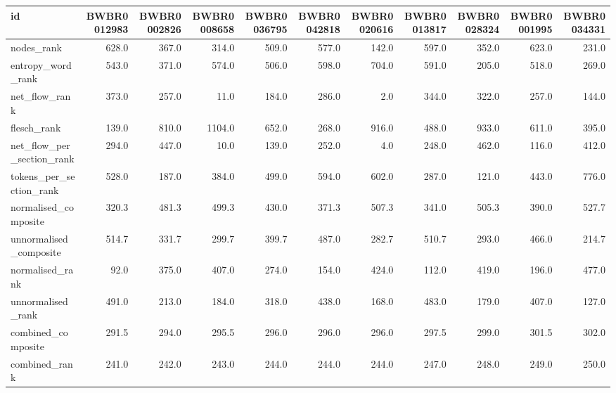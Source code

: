 \begin{tabular}{lrrrrrrrrrr}
\toprule
id & BWBR0012983 & BWBR0002826 & BWBR0008658 & BWBR0036795 & BWBR0042818 & BWBR0020616 & BWBR0013817 & BWBR0028324 & BWBR0001995 & BWBR0034331 \\
\midrule
nodes\_rank & 628.0 & 367.0 & 314.0 & 509.0 & 577.0 & 142.0 & 597.0 & 352.0 & 623.0 & 231.0 \\
\cline{1-11}
entropy\_word\_rank & 543.0 & 371.0 & 574.0 & 506.0 & 598.0 & 704.0 & 591.0 & 205.0 & 518.0 & 269.0 \\
\cline{1-11}
net\_flow\_rank & 373.0 & 257.0 & 11.0 & 184.0 & 286.0 & 2.0 & 344.0 & 322.0 & 257.0 & 144.0 \\
\cline{1-11}
flesch\_rank & 139.0 & 810.0 & 1104.0 & 652.0 & 268.0 & 916.0 & 488.0 & 933.0 & 611.0 & 395.0 \\
\cline{1-11}
net\_flow\_per\_section\_rank & 294.0 & 447.0 & 10.0 & 139.0 & 252.0 & 4.0 & 248.0 & 462.0 & 116.0 & 412.0 \\
\cline{1-11}
tokens\_per\_section\_rank & 528.0 & 187.0 & 384.0 & 499.0 & 594.0 & 602.0 & 287.0 & 121.0 & 443.0 & 776.0 \\
\cline{1-11}
normalised\_composite & 320.3 & 481.3 & 499.3 & 430.0 & 371.3 & 507.3 & 341.0 & 505.3 & 390.0 & 527.7 \\
\cline{1-11}
unnormalised\_composite & 514.7 & 331.7 & 299.7 & 399.7 & 487.0 & 282.7 & 510.7 & 293.0 & 466.0 & 214.7 \\
\cline{1-11}
normalised\_rank & 92.0 & 375.0 & 407.0 & 274.0 & 154.0 & 424.0 & 112.0 & 419.0 & 196.0 & 477.0 \\
\cline{1-11}
unnormalised\_rank & 491.0 & 213.0 & 184.0 & 318.0 & 438.0 & 168.0 & 483.0 & 179.0 & 407.0 & 127.0 \\
\cline{1-11}
combined\_composite & 291.5 & 294.0 & 295.5 & 296.0 & 296.0 & 296.0 & 297.5 & 299.0 & 301.5 & 302.0 \\
\cline{1-11}
combined\_rank & 241.0 & 242.0 & 243.0 & 244.0 & 244.0 & 244.0 & 247.0 & 248.0 & 249.0 & 250.0 \\
\cline{1-11}
\bottomrule
\end{tabular}
